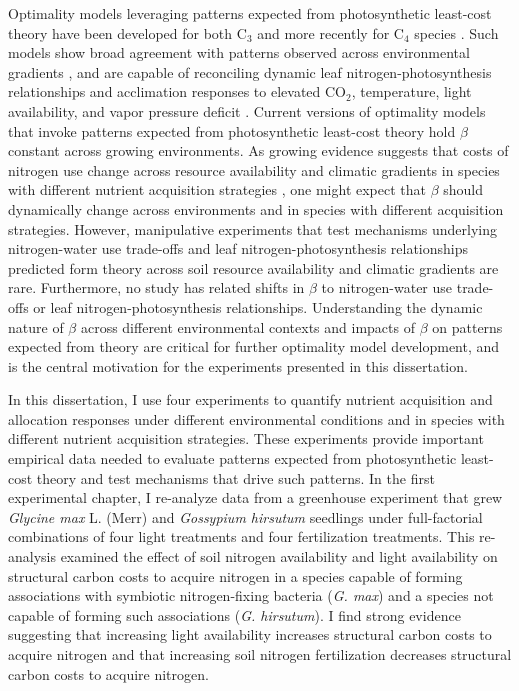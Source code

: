 Optimality models leveraging patterns expected from photosynthetic least-cost theory have been developed for both C$_3$  and more recently for C$_4$ species . Such models show broad agreement with patterns observed across environmental gradients , and are capable of reconciling dynamic leaf nitrogen-photosynthesis relationships and acclimation responses to elevated CO$_2$, temperature, light availability, and vapor pressure deficit . Current versions of optimality models that invoke patterns expected from photosynthetic least-cost theory hold $\beta$ constant across growing environments. As growing evidence suggests that costs of nitrogen use change across resource availability and climatic gradients in species with different nutrient acquisition strategies , one might expect that $\beta$ should dynamically change across environments and in species with different acquisition strategies. However, manipulative experiments that test mechanisms underlying nitrogen-water use trade-offs and leaf nitrogen-photosynthesis relationships predicted form theory across soil resource availability and climatic gradients are rare. Furthermore, no study has related shifts in $\beta$ to nitrogen-water use trade-offs or leaf nitrogen-photosynthesis relationships. Understanding the dynamic nature of $\beta$ across different environmental contexts and impacts of $\beta$ on patterns expected from theory are critical for further optimality model development, and is the central motivation for the experiments presented in this dissertation.

In this dissertation, I use four experiments to quantify nutrient acquisition and allocation responses under different environmental conditions and in species with different nutrient acquisition strategies. These experiments provide important empirical data needed to evaluate patterns expected from photosynthetic least-cost theory and test mechanisms that drive such patterns. In the first experimental chapter, I re-analyze data from a greenhouse experiment that grew \textit{Glycine max} L. (Merr) and \textit{Gossypium hirsutum} seedlings under full-factorial combinations of four light treatments and four fertilization treatments. This re-analysis examined the effect of soil nitrogen availability and light availability on structural carbon costs to acquire nitrogen in a species capable of forming associations with symbiotic nitrogen-fixing bacteria (\textit{G. max}) and a species not capable of forming such associations (\textit{G. hirsutum}). I find strong evidence suggesting that increasing light availability increases structural carbon costs to acquire nitrogen and that increasing soil nitrogen fertilization decreases structural carbon costs to acquire nitrogen.

